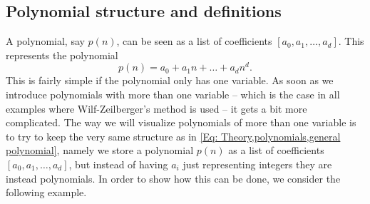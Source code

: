\subsection{Polynomial structure and definitions}\label{Sub: polystruct}

A polynomial, say $p(n)$, can be seen as a list of coefficients $[a_0,a_1,\ldots,a_d]$. This represents the polynomial
\begin{equation}\label{Eq: Theory,polynomials,general polynomial}
  p(n) = a_0+a_1 n + \ldots + a_d n^d.
\end{equation}
This is fairly simple if the polynomial only has one variable. As soon as we introduce polynomials with more than one variable -- which is the case in all examples where Wilf-Zeilberger's method is used -- it gets a bit more complicated. The way we will visualize polynomials of more than one variable is to try to keep the very same structure as in \ref{Eq: Theory,polynomials,general polynomial}, namely we store a polynomial $p(n)$ as a list of coefficients $[a_0,a_1,\ldots,a_d]$, but instead of having $a_i$ just representing integers they are instead polynomials. In order to show how this can be done, we consider the following example.
